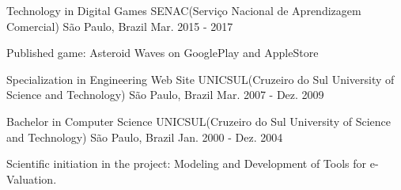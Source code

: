 

\begin{cventries}

  \cventry
    {Technology in Digital Games} %
    {SENAC(Serviço Nacional de Aprendizagem Comercial)} %
    {São Paulo, Brazil} %
    {Mar. 2015 - 2017} %
    {
      \begin{cvitems} %
        \item {Published game: Asteroid Waves on GooglePlay and AppleStore}
      \end{cvitems}
    }

  \cventry
    {Specialization in Engineering Web Site} %
    {UNICSUL(Cruzeiro do Sul University of Science and Technology)} %
    {São Paulo, Brazil} %
    {Mar. 2007 - Dez. 2009} %
    {}

  \cventry
    {Bachelor in Computer Science} %
    {UNICSUL(Cruzeiro do Sul University of Science and Technology)} %
    {São Paulo, Brazil} %
    {Jan. 2000 - Dez. 2004} %
    {
      \begin{cvitems} %
        \item {Scientific initiation in the project: Modeling and Development of Tools for e-Valuation.}
      \end{cvitems}
    }


\end{cventries}
